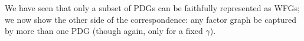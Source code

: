 \documentclass{article}
\begin{document}
	\begin{inactive}
	We have seen that only a subset of PDGs can be faithfully 
	represented as WFGs; we now show the other side of the correspondence: any
	factor graph be captured by more than one PDG (though again, only for a fixed $\gamma$).
\end{inactive}
	
	
	
	
	
	
	
	
\end{document}
